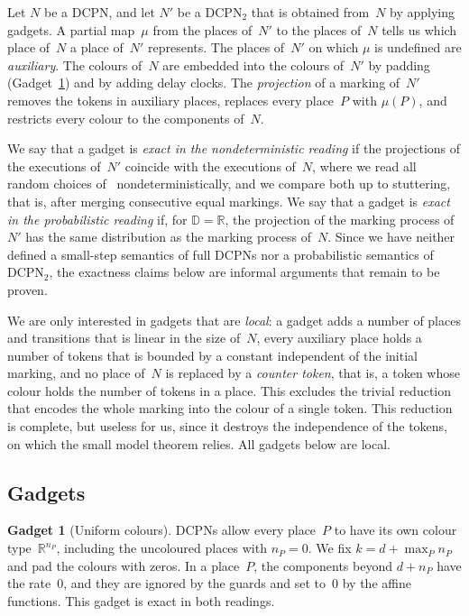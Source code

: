 \documentclass[11pt]{article}
\theoremstyle{definition}
\newcommand{\Real}{\mathbb{R}}
\newcommand{\Dom}{\mathbb{D}}
\newcommand{\DCPN}[1]{\texorpdfstring{\textup{DCPN}\ensuremath{_{#1}}}{DCPN#1}}
\newtheorem{gadget}{Gadget}
\begin{document}
Let $N$ be a DCPN, and let $N'$ be a \DCPN{2} that is obtained from~$N$ by
applying gadgets. A partial map~$\mu$ from the places of~$N'$ to the places
of~$N$ tells us which place of~$N$ a place of~$N'$ represents. The places
of~$N'$ on which $\mu$ is undefined are \emph{auxiliary}. The colours of~$N$
are embedded into the colours of~$N'$ by padding (Gadget~\ref{gad:pad}) and by
adding delay clocks. The \emph{projection} of a marking of~$N'$ removes the
tokens in auxiliary places, replaces every place~$P$ with $\mu(P)$, and
restricts every colour to the components of~$N$.

We say that a gadget is \emph{exact in the nondeterministic reading} if the
projections of the executions of~$N'$ coincide with the executions of~$N$,
where we read all random choices of~\cite{EverdijBlom2005}
nondeterministically, and we compare both up to stuttering, that is, after
merging consecutive equal markings. We say that a gadget is \emph{exact in
the probabilistic reading} if, for $\Dom = \Real$, the
projection of the marking process of~$N'$ has the same distribution as the
marking process of~$N$. Since we have neither defined a small-step semantics
of full DCPNs nor a probabilistic semantics of \DCPN{2}, the exactness claims
below are informal arguments that remain to be proven.

We are only interested in gadgets that are \emph{local}: a gadget adds a
number of places and transitions that is linear in the size of~$N$, every
auxiliary place holds a number of tokens that is bounded by a constant
independent of the initial marking, and no place of~$N$ is replaced by a
\emph{counter token}, that is, a token whose colour holds the number of
tokens in a place. This excludes the trivial reduction that encodes the whole
marking into the colour of a single token. This reduction is complete, but
useless for us, since it destroys the independence of the tokens, on which the
small model theorem relies. All gadgets below are local.

\subsection{Gadgets}

\begin{gadget}[Uniform colours]\label{gad:pad}
  DCPNs allow every place~$P$ to have its own colour type~$\Real^{n_P}$,
  including the uncoloured places with $n_P = 0$. We fix
  $k = d + \max_P n_P$ and pad the colours with zeros. In a place~$P$, the
  components beyond $d + n_P$ have the rate~$0$, and they are ignored by the
  guards and set to~$0$ by the affine functions. This gadget is exact in both
  readings.
\end{gadget}
\end{document}
